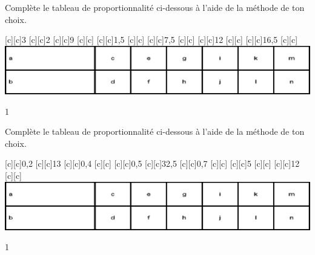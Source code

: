\documentclass[a4paper,11pt]{report}
\begin{document}
\begin{exop}{
Complète le tableau de proportionnalité ci-dessous à l'aide de la méthode de ton choix.
\begin{center}
[c][c]{3}
[c][c]{2}
[c][c]{9}
[c][c]{}
[c][c]{1,5}
[c][c]{}
[c][c]{7,5}
[c][c]{}
[c][c]{12}
[c][c]{}
[c][c]{16,5}
[c][c]{}
\includegraphics[scale=.9]{media/fa-30/tableaut.eps}
\end{center}
\vspace{-0.5cm}}{1}
\end{exop}

\begin{exop}{
Complète le tableau de proportionnalité ci-dessous à l'aide de la méthode de ton choix.
\begin{center}
[c][c]{0,2}
[c][c]{13}
[c][c]{0,4}
[c][c]{}
[c][c]{0,5}
[c][c]{32,5}
[c][c]{0,7}
[c][c]{}
[c][c]{5}
[c][c]{}
[c][c]{12}
[c][c]{}
\includegraphics[scale=.9]{media/fa-30/tableaut.eps}
\end{center}
\vspace{-0.5cm}}{1}
\end{exop}










\end{document}

